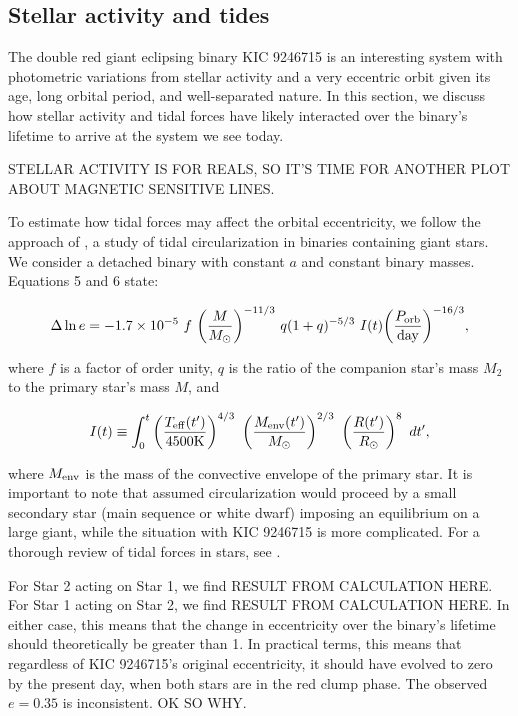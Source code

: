 \subsection{Stellar activity and tides}\label{context}
The double red giant eclipsing binary KIC 9246715 is an interesting system with photometric variations from stellar activity and a very eccentric orbit given its age, long orbital period, and well-separated nature. In this section, we discuss how stellar activity and tidal forces have likely interacted over the binary's lifetime to arrive at the system we see today.

STELLAR ACTIVITY IS FOR REALS, SO IT'S TIME FOR ANOTHER PLOT ABOUT MAGNETIC SENSITIVE LINES.

To estimate how tidal forces may affect the orbital eccentricity, we follow the approach of \citet{ver95}, a study of tidal circularization in binaries containing giant stars. We consider a detached binary with constant $a$ and constant binary masses. Equations 5 and 6 \citep{ver95} state:

\begin{equation}\label{tide1}
\Delta \ln e = -1.7 \times 10^{-5} \ f \ {\left( \frac{M}{M_{\odot}} \right)}^{-11/3} \ q(1+q)^{-5/3} \ I(t) {\left( \frac{P_{\rm{orb}}}{\rm{day}} \right)}^{-16/3},
\end{equation}

where $f$ is a factor of order unity, $q$ is the ratio of the companion star's mass $M_2$ to the primary star's mass $M$, and

\begin{equation}
I(t) \equiv \int_0^t \left( \frac{T_{\rm{eff}}(t')}{4500 \rm{K}} \right)^{4/3} \ \left( \frac{M_{\rm{env}}(t')}{M_{\odot}} \right)^{2/3} \ \left( \frac{R(t')}{R_{\odot}} \right)^8 \ dt',
\end{equation}

where $M_{\rm{env}}$ is the mass of the convective envelope of the primary star. It is important to note that \citet{ver95} assumed circularization would proceed by a small secondary star (main sequence or white dwarf) imposing an equilibrium on a large giant, while the situation with KIC 9246715 is more complicated. For a thorough review of tidal forces in stars, see \citet{ogi14}.

For Star 2 acting on Star 1, we find RESULT FROM CALCULATION HERE. For Star 1 acting on Star 2, we find RESULT FROM CALCULATION HERE. In either case, this means that the change in eccentricity over the binary's lifetime should theoretically be greater than 1. In practical terms, this means that regardless of KIC 9246715's original eccentricity, it should have evolved to zero by the present day, when both stars are in the red clump phase. The observed $e = 0.35$ is inconsistent. OK SO WHY.

